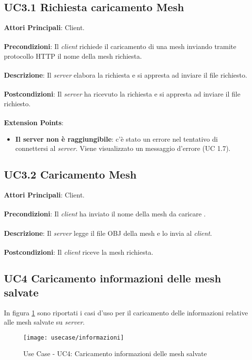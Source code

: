 \subsection{UC3.1 Richiesta caricamento Mesh}
\textbf{Attori Principali}: Client.
\\\\ \textbf{Precondizioni}: Il \emph{client} richiede il caricamento di una mesh inviando tramite protocollo HTTP il nome della mesh richiesta.
\\\\ \textbf{Descrizione}: Il \emph{server} elabora la richiesta e si appresta ad inviare il file richiesto.
\\\\ \textbf{Postcondizioni}: Il \emph{server} ha ricevuto la richiesta e si appresta ad inviare il file richiesto.
\\\\ \textbf{Extension Points}:
\begin{itemize}
\item \textbf{Il server non è raggiungibile}: c'è stato un errore nel tentativo di connettersi al \emph{server}. Viene visualizzato un messaggio d'errore (UC 1.7).
\end{itemize}

\subsection{UC3.2 Caricamento Mesh}
\textbf{Attori Principali}: Client.
\\\\ \textbf{Precondizioni}: Il \emph{client} ha inviato il nome della mesh da caricare .
\\\\ \textbf{Descrizione}: Il \emph{server} legge il file OBJ della mesh e lo invia al \emph{client}.
\\\\ \textbf{Postcondizioni}: Il \emph{client} riceve la mesh richiesta.


\subsection{UC4 Caricamento informazioni delle mesh salvate}
In figura \ref{fig:loadinfo} sono riportati i casi d'uso per il caricamento delle informazioni relative alle mesh salvate su \emph{server}.
\begin{figure}[!h] 
    \centering 
    \texttt{[image: usecase/informazioni]} 
    \caption{Use Case - UC4: Caricamento informazioni delle mesh salvate}
    \label{fig:loadinfo}
\end{figure}

